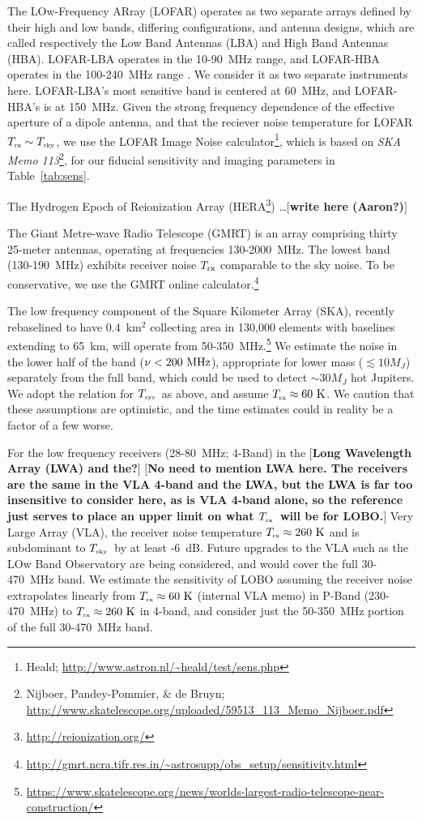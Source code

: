 \documentclass[iop,numberedappendix,apj]{emulateapj}
\def\memoYF#1{\color{red}$[${\bf #1}$]$ \color{black}}
\def\memoDS#1{\color{blue}$[${\bf #1}$]$ \color{black}}
\def\memoTM#1{\color{DarkGreen}$[${\bf #1}$]$ \color{black}}
\newcommand{\Tsky}{\mbox{$T_{\mbox{\tiny sky}}$}}
\newcommand{\Tsys}{\mbox{$T_{\mbox{\tiny sys}}$}}
\newcommand{\Trx}{\mbox{$T_{\mbox{\tiny rx}}$}}
\begin{document}
The LOw-Frequency ARray (LOFAR) operates as two separate arrays defined by their high and low bands, differing configurations, and antenna designs, which are called respectively the Low Band Antennas (LBA) and High Band Antennas (HBA).
LOFAR-LBA operates in the 10-90~MHz range, and LOFAR-HBA operates in the 100-240~MHz range \citep{vanHaarlem2013}.
We consider it as two separate instruments here.
LOFAR-LBA's most sensitive band is centered at 60~MHz, and LOFAR-HBA's is at 150~MHz.
Given the strong frequency dependence of the effective aperture of a dipole antenna, and that the reciever noise temperature for LOFAR $\Trx \sim \Tsky$, we use the LOFAR Image Noise calculator\footnote{Heald; \url{http://www.astron.nl/~heald/test/sens.php}}, which is based on {\it SKA Memo 113}\footnote{Nijboer, Pandey-Pommier, \& de Bruyn; \url{http://www.skatelescope.org/uploaded/59513\_113\_Memo\_Nijboer.pdf}}, for our fiducial sensitivity and imaging parameters in Table~\ref{tab:sens}.

The Hydrogen Epoch of Reionization Array (HERA\footnote{\url{http://reionization.org/}}) \ldots \memoYF{write here (Aaron?)}

The Giant Metre-wave Radio Telescope (GMRT) is an array comprising thirty 25-meter antennas, operating at frequencies 130-2000~MHz.
The lowest band (130-190~MHz) exhibits receiver noise $T_{\rm rx}$ comparable to the sky noise.
To be conservative, we use the GMRT online calculator.\footnote{\url{http://gmrt.ncra.tifr.res.in/~astrosupp/obs\_setup/sensitivity.html}}


The low frequency component of the Square Kilometer Array (SKA), recently rebaselined to have 0.4~km$^2$ collecting area in 130,000 elements with baselines extending to 65~km, will operate from 50-350~MHz.\footnote{\url{https://www.skatelescope.org/news/worlds-largest-radio-telescope-near-construction/}}
We estimate the noise in the lower half of the band ($\nu<200~\rm MHz$), appropriate for lower mass ($\lesssim 10 M_J$) separately from the full band, which could be used to detect $\sim 30 M_J$ hot Jupiters.
We adopt the \cite{Rogers+Bowman2008} relation for \Tsys\ as above, and assume $\Trx \approx 60~\rm K$.
We caution that these assumptions are optimistic, and the time estimates could in reality be a factor of a few worse.

For the low frequency receivers (28-80~MHz; 4-Band) in the \memoDS{Long Wavelength Array (LWA) and the?}\memoTM{No need to mention LWA here.  The receivers are the same in the VLA 4-band and the LWA, but the LWA is far too insensitive to consider here, as is VLA 4-band alone, so the reference just serves to place an upper limit on what \Trx\ will be for LOBO.} Very Large Array (VLA), the receiver noise temperature $\Trx \approx 260~\rm K$ \citep{Hicks2012} and is subdominant to \Tsky\ by at least -6~dB.
Future upgrades to the VLA such as the LOw Band Observatory \citep[LOBO][]{Kassim2015IAU} are being considered, and would cover the full 30-470~MHz band.
We estimate the sensitivity of LOBO assuming the receiver noise extrapolates linearly from $\Trx \approx 60~\rm K$ (internal VLA memo) in P-Band (230-470~MHz) to $\Trx \approx 260~\rm K$ in 4-band, and consider just the 50-350~MHz portion of the full 30-470~MHz band.
\end{document}
